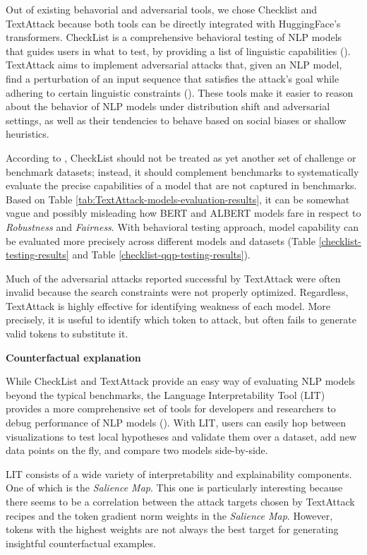 \documentclass{article}
\begin{document}
Out of existing behavorial and adversarial tools, we chose Checklist and TextAttack because both tools can be directly integrated with HuggingFace’s transformers. CheckList is a comprehensive behavioral testing of NLP models that guides users in what to test, by providing a list of linguistic capabilities (\citet{Ribeiro2020BeyondAB}). TextAttack aims to implement adversarial attacks that, given an NLP model, find a perturbation of an input sequence that satisfies the attack's goal while adhering to certain linguistic constraints (\citet{Morris2020TextAttackAF}). These tools make it easier to reason about the behavior of NLP models under distribution shift and adversarial settings, as well as their tendencies to behave based on social biases or shallow heuristics.

According to \citet{Ribeiro2020BeyondAB}, CheckList should not be treated as yet another set of challenge or benchmark datasets; instead, it should complement benchmarks to systematically evaluate the precise capabilities of a model that are not captured in benchmarks. Based on Table \ref{tab:TextAttack-models-evaluation-results}, it can be somewhat vague and possibly misleading how BERT and ALBERT models fare in respect to \emph{Robustness} and \emph{Fairness}. With behavioral testing approach, model capability can be evaluated more precisely across different models and datasets (Table \ref{checklist-testing-results} and Table \ref{checklist-qqp-testing-results}).

Much of the adversarial attacks reported successful by TextAttack \cite{Morris2020TextAttackAF} were often invalid because the search constraints were not properly optimized. Regardless, TextAttack \cite{Morris2020TextAttackAF} is highly effective for identifying weakness of each model. More precisely, it is useful to identify which token to attack, but often fails to generate valid tokens to substitute it.


\textbf{Counterfactual explanation}

While CheckList \cite{Ribeiro2020BeyondAB} and TextAttack \cite{Morris2020TextAttackAF} provide an easy way of evaluating NLP models beyond the typical benchmarks, the Language Interpretability Tool (LIT) provides a more comprehensive set of tools for developers and researchers to debug performance of NLP models (\citet{Tenney2020TheLI}). With LIT, users can easily hop between visualizations to test local hypotheses and validate them over a dataset, add new data points on the fly, and compare two models side-by-side.

LIT \cite{Tenney2020TheLI} consists of a wide variety of interpretability and explainability components. One of which is the \emph{Salience Map}. This one is particularly interesting because there seems to be a correlation between the attack targets chosen by TextAttack \cite{Morris2020TextAttackAF} recipes and the token gradient norm weights in the \emph{Salience Map}. However, tokens with the highest weights are not always the best target for generating insightful counterfactual examples.

\clearpage





\appendix

\processdelayedfloats
\end{document}

